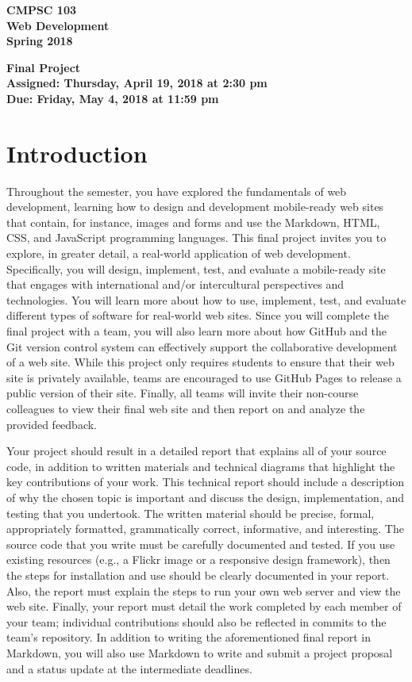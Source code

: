 \documentclass[11pt]{article}
\newcommand{\assignmentduedate}{May 4}
\newcommand{\assignmentassignedate}{April 19}
\newcommand{\labyear}{2018}
\newcommand{\labday}{Thursday}
\newcommand{\labdueday}{Friday}
\newcommand{\labtime}{2:30 pm}
\newcommand{\labduetime}{11:59 pm}
\newcommand{\assigneddate}{Assigned: \labday, \assignmentassignedate, \labyear{} at \labtime{}}
\newcommand{\duedate}{Due: \labdueday, \assignmentduedate, \labyear{} at \labduetime{}}
\newcommand{\labtitle}[1]
{
  \begin{center}
    \begin{center}
      \bf
      CMPSC 103\\Web Development\\
      Spring 2018\\
      \medskip
    \end{center}
    \bf
    #1
  \end{center}
}
\begin{document}
\thispagestyle{empty}

\labtitle{Final Project \\ \assigneddate{} \\ \duedate{}}

\section*{Introduction}

Throughout the semester, you have explored the fundamentals of web development,
learning how to design and development mobile-ready web sites that contain, for
instance, images and forms and use the Markdown, HTML, CSS, and JavaScript
programming languages. This final project invites you to explore, in greater
detail, a real-world application of web development. Specifically, you will
design, implement, test, and evaluate a mobile-ready site that engages with
international and/or intercultural perspectives and technologies. You will learn
more about how to use, implement, test, and evaluate different types of software
for real-world web sites. Since you will complete the final project with a team,
you will also learn more about how GitHub and the Git version control system can
effectively support the collaborative development of a web site. While this
project only requires students to ensure that their web site is privately
available, teams are encouraged to use GitHub Pages to release a public version
of their site. Finally, all teams will invite their non-course colleagues to
view their final web site and then report on and analyze the provided feedback.

Your project should result in a detailed report that explains all of your source
code, in addition to written materials and technical diagrams that highlight the
key contributions of your work. This technical report should include a
description of why the chosen topic is important and discuss the design,
implementation, and testing that you undertook. The written material should be
precise, formal, appropriately formatted, grammatically correct, informative,
and interesting. The source code that you write must be carefully documented and
tested. If you use existing resources (e.g., a Flickr image or a responsive
design framework), then the steps for installation and use should be clearly
documented in your report. Also, the report must explain the steps to run your
own web server and view the web site. Finally, your report must detail the work
completed by each member of your team; individual contributions should also be
reflected in commits to the team's repository. In addition to writing the
aforementioned final report in Markdown, you will also use Markdown to write and
submit a project proposal and a status update at the intermediate deadlines.
\end{document}
